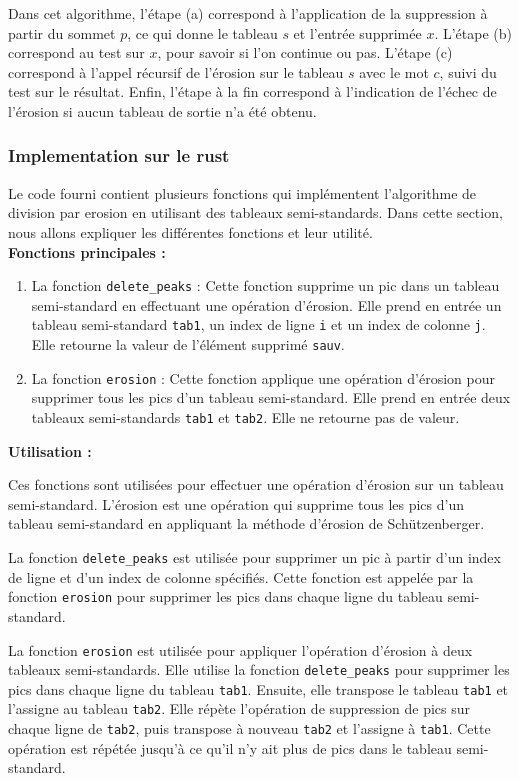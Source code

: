  Dans cet algorithme, l'étape (a) correspond à l'application de la suppression à partir du sommet $p$, 
 ce qui donne le tableau $s$ et l'entrée supprimée $x$. L'étape (b) correspond au test sur $x$, 
 pour savoir si l'on continue ou pas. L'étape (c) correspond à l'appel récursif de l'érosion sur le tableau $s$ avec le mot $c$, 
 suivi du test sur le résultat. 
 Enfin, l'étape à la fin correspond à l'indication de l'échec de l'érosion si aucun tableau de sortie n'a été obtenu.

\subsubsection{Implementation sur le rust}
Le code fourni contient plusieurs fonctions qui implémentent l'algorithme de division par erosion en utilisant des tableaux semi-standards.
 Dans cette section, nous allons expliquer les différentes fonctions et leur utilité. \\
\textbf{Fonctions principales :}
\begin{enumerate}
\item La fonction \verb|delete_peaks| :
Cette fonction supprime un pic dans un tableau semi-standard en effectuant une opération d'érosion. Elle prend en entrée un tableau semi-standard \verb|tab1|, un index de ligne \verb|i| et un index de colonne \verb|j|. Elle retourne la valeur de l'élément supprimé \verb|sauv|.
\item La fonction \verb|erosion| :
Cette fonction applique une opération d'érosion pour supprimer tous les pics d'un tableau semi-standard. Elle prend en entrée deux tableaux semi-standards \verb|tab1| et \verb|tab2|. Elle ne retourne pas de valeur.
\end{enumerate}

\textbf{Utilisation :}

Ces fonctions sont utilisées pour effectuer une opération d'érosion sur un tableau semi-standard. L'érosion est une opération qui supprime tous les pics d'un tableau semi-standard en appliquant la méthode d'érosion de Schützenberger.

La fonction \verb|delete_peaks| est utilisée pour supprimer un pic à partir d'un index de ligne et d'un index de colonne spécifiés. Cette fonction est appelée par la fonction \verb|erosion| pour supprimer les pics dans chaque ligne du tableau semi-standard.

La fonction \verb|erosion| est utilisée pour appliquer l'opération d'érosion à deux tableaux semi-standards. Elle utilise la fonction \verb|delete_peaks| pour supprimer les pics dans chaque ligne du tableau \verb|tab1|. Ensuite, elle transpose le tableau \verb|tab1| et l'assigne au tableau \verb|tab2|. Elle répète l'opération de suppression de pics sur chaque ligne de \verb|tab2|, puis transpose à nouveau \verb|tab2| et l'assigne à \verb|tab1|. Cette opération est répétée jusqu'à ce qu'il n'y ait plus de pics dans le tableau semi-standard.

